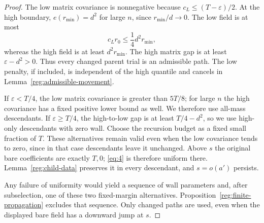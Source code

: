 \begin{proof}
The low matrix covariance is nonnegative because
$c_L\le(T-\varepsilon)/2$.  At the high boundary,
$e(r_{\min})=d^2$ for large $n$, since $r_{\min}/d\to0$.
The low field is at most
\[
 c_Lr_0\le\frac14d^2r_{\min},
\]
whereas the high field is at least $d^2r_{\min}$.
The high matrix gap is at least $\varepsilon-d^2>0$.
Thus every changed parent trial is an admissible path.
The low penalty, if included, is independent of the high quantile
and cancels in Lemma~\ref{reg:admissible-movement}.

If $\varepsilon<T/4$, the low matrix covariance is greater than
$5T/8$; for large $n$ the high covariance has a fixed positive
lower bound as well.  We therefore use all-mass descendants.
If $\varepsilon\ge T/4$, the high-to-low gap is at least
$T/4-d^2$, so we use high-only descendants with zero wall.
Choose the recursion budget as a fixed small fraction of $T$.
These alternatives remain valid even when the low covariance
tends to zero, since in that case descendants leave it unchanged.
Above $s$ the original bare coefficients are exactly $T,0$;
\eqref{eq:4} is therefore uniform there.  Lemma~\ref{reg:child-data}
preserves it in every descendant, and $s=o(a')$ persists.

Any failure of uniformity would yield a sequence of wall parameters
and, after subselection, one of these two fixed-margin alternatives.
Proposition~\ref{reg:finite-propagation} excludes that sequence.
Only changed paths are used, even when the displayed bare field
has a downward jump at $s$.
\end{proof}
